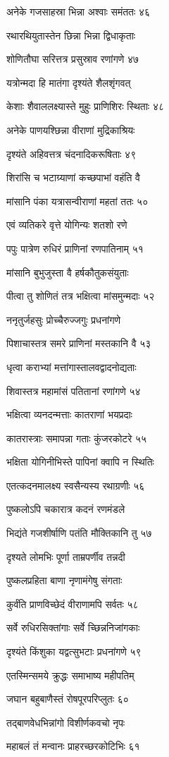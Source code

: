 अनेके गजसाहस्रा भिन्ना अश्वाः समंततः ४६

रथारथियुतास्तेन छिन्ना भिन्ना द्विधाकृताः

शोणितौघा सरित्तत्र प्रसुस्राव रणांगणे ४७

यत्रोन्मदा हि मातंगा दृश्यंते शैलशृंगवत्

केशाः शैवाललक्ष्यास्ते मुहुः प्राणिशिरः स्थिताः ४८

अनेके पाणयश्छिन्ना वीराणां मुद्रिकाश्रियः

दृश्यंते अहिवत्तत्र चंदनादिकरूषिताः ४९

शिरांसि च भटाग्र्याणां कच्छपाभां वहंति वै

मांसानि पंका यत्रासन्वीराणां महतां ततः ५०

एवं व्यतिकरे वृत्ते योगिन्यः शतशो रणे

पपुः पात्रेण रुधिरं प्राणिनां रणपातिनाम् ५१

मांसानि बुभुजुस्ता वै हर्षकौतुकसंयुताः

पीत्वा तु शोणितं तत्र भक्षित्वा मांसमुन्मदाः ५२

ननृतुर्जहसुः प्रोच्चैरुज्जगुः प्रधनांगणे

पिशाचास्तत्र समरे प्राणिनां मस्तकानि वै ५३

धृत्वा कराभ्यां मत्तांगास्तालवद्वादनोद्यताः

शिवास्तत्र महामांसं पतितानां रणांगणे ५४

भक्षित्वा व्यनदन्मत्ताः कातराणां भयप्रदाः

कातरास्त्राः समापन्ना गताः कुंजरकोटरे ५५

भक्षिता योगिनीभिस्ते पापिनां क्वापि न स्थितिः

एतत्कदनमालक्ष्य स्वसैन्यस्य रथाग्रणीः ५६

पुष्कलोऽपि चकारात्र कदनं रणमंडले

भिद्यंते गजशीर्षाणि पतंति मौक्तिकानि तु ५७

दृश्यते लोमभिः पूर्णा ताम्रपर्णीव तन्नदी

पुष्कलप्रहिता बाणा नृणामंगेषु संगताः

कुर्वंति प्राणविच्छेदं वीराणामपि सर्वतः ५८

सर्वे रुधिरसिक्तांगाः सर्वे च्छिन्ननिजांगकाः

दृश्यंते किंशुका यद्वत्सुभटाः प्रधनांगणे ५९

एतस्मिन्समये क्रुद्धः समाभाष्य महीपतिम्

जघान बहुबाणैस्तं रोषपूरपरिप्लुतः ६०

तद्बाणवेधभिन्नांगो विशीर्णकवचो नृपः

महाबलं तं मन्वानः प्राहरच्छरकोटिभिः ६१

